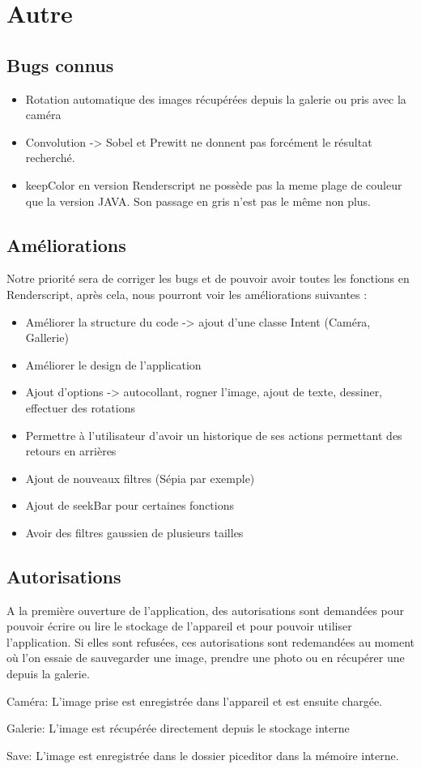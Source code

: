 \documentclass{article}
\begin{document}
\section{Autre}
\subsection{Bugs connus}

\begin{itemize}
    \item Rotation automatique des images récupérées depuis la galerie ou pris avec la caméra
    \item Convolution -> Sobel et Prewitt ne donnent pas forcément le résultat recherché.
    \item keepColor en version Renderscript ne possède pas la meme plage de couleur que la version JAVA. Son passage en gris n'est pas le même non plus.
\end{itemize}

\subsection{Améliorations}

Notre priorité sera de corriger les bugs et de pouvoir avoir toutes les fonctions en Renderscript, après cela, nous pourront voir les améliorations suivantes :

\begin{itemize}
    \item Améliorer la structure du code -> ajout d'une classe Intent (Caméra, Gallerie)
    \item Améliorer le design de l'application
    \item Ajout d'options -> autocollant, rogner l'image, ajout de texte, dessiner, effectuer des rotations
    \item Permettre à l'utilisateur d'avoir un historique de ses actions permettant des retours en arrières
    \item Ajout de nouveaux filtres (Sépia par exemple)
    \item Ajout de seekBar pour certaines fonctions
    \item Avoir des filtres gaussien de plusieurs tailles
\end{itemize}

\subsection{Autorisations}

A la première ouverture de l'application, des autorisations sont demandées pour pouvoir écrire ou lire le stockage de l'appareil et pour pouvoir utiliser l'application.
Si elles sont refusées, ces autorisations sont redemandées au moment où l'on essaie de sauvegarder une image, prendre une photo ou en récupérer une depuis la galerie.

Caméra: L'image prise est enregistrée dans l'appareil et est ensuite chargée.

Galerie: L'image est récupérée directement depuis le stockage interne

Save: L'image est enregistrée dans le dossier piceditor dans la mémoire interne.
\end{document}
